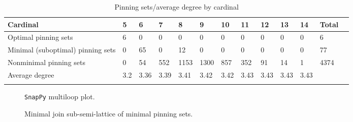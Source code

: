 \documentclass{article}%
\begin{document}
\begin{table}[ht]
	\caption{Pinning sets/average degree by cardinal}
	\centering
	\renewcommand{\arraystretch}{1.5}
	\begin{tabularx}{\textwidth}{lXXXXXXXXXXXX}
		\toprule
			Cardinal & 5 & 6 & 7 & 8 & 9 & 10 & 11 & 12 & 13 & 14 & Total\\
			\hline
			Optimal pinning sets & 6 & 0 & 0 & 0 & 0 & 0 & 0 & 0 & 0 & 0 & 6 \\
			Minimal (suboptimal) pinning sets & 0 & 65 & 0 & 12 & 0 & 0 & 0 & 0 & 0 & 0 & 77 \\
			Nonminimal pinning sets & 0 & 54 & 552 & 1153 & 1300 & 857 & 352 & 91 & 14 & 1 & 4374 \\
			Average degree & 3.2 & 3.36 & 3.39 & 3.41 & 3.42 & 3.42 & 3.43 & 3.43 & 3.43 & 3.43 &  \\
		\bottomrule \\ 
	\end{tabularx}
\end{table}

\begin{multicols}{2}
\begin{figure}[H]
\centering

\caption{\texttt{SnapPy} multiloop plot.}
\label{fig:tex/img/[[6, 12, 1, 7], [7, 13, 8, 18], [5, 17, 6, 18], [11, 24, 12, 19], [1, 24, 2, 23], [13, 23, 14, 22], [8, 22, 9, 21], [4, 20, 5, 21], [16, 19, 17, 20], [10, 15, 11, 16], [2, 15, 3, 14], [9, 3, 10, 4]].svg}
\end{figure}
\columnbreak

\begin{figure}[H]
\centering
\scalebox{0.8}{}
\caption{Minimal join sub-semi-lattice of minimal pinning sets.}
\label{fig:tex/img/[[6, 12, 1, 7], [7, 13, 8, 18], [5, 17, 6, 18], [11, 24, 12, 19], [1, 24, 2, 23], [13, 23, 14, 22], [8, 22, 9, 21], [4, 20, 5, 21], [16, 19, 17, 20], [10, 15, 11, 16], [2, 15, 3, 14], [9, 3, 10, 4]].pgf}
\end{figure}
\end{multicols}

\newpage
\end{document}
